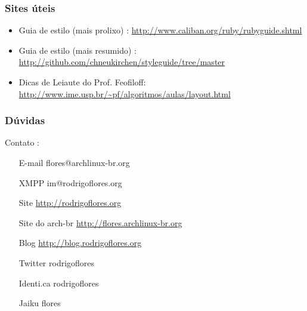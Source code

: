 \documentclass{beamer}
\begin{document}
\begin{frame}
  \frametitle{Sites úteis}
  \begin{itemize}
    \item Guia de estilo (mais prolixo) : \url{http://www.caliban.org/ruby/rubyguide.shtml} 
    \item Guia de estilo (mais resumido) : \url{http://github.com/chneukirchen/styleguide/tree/master} 
    \item Dicas de Leiaute do Prof. Feofiloff: \url{http://www.ime.usp.br/~pf/algoritmos/aulas/layout.html} 
  \end{itemize}
\end{frame}

\begin{frame}
    \frametitle{Dúvidas}
    \begin{block}{Contato :}
        \begin{itemize}
            \centering
            \item[E-mail] flores@archlinux-br.org        
            \item[XMPP]  im@rodrigoflores.org        
            \item[Site]  \url{http://rodrigoflores.org}
            \item[Site do arch-br]  \url{http://flores.archlinux-br.org}
            \item[Blog]  \url{http://blog.rodrigoflores.org}        
            \item[Twitter] rodrigoflores        
            \item[Identi.ca] rodrigoflores        
            \item[Jaiku] flores        
        \end{itemize}
    \end{block}

\end{frame}
\end{document}
